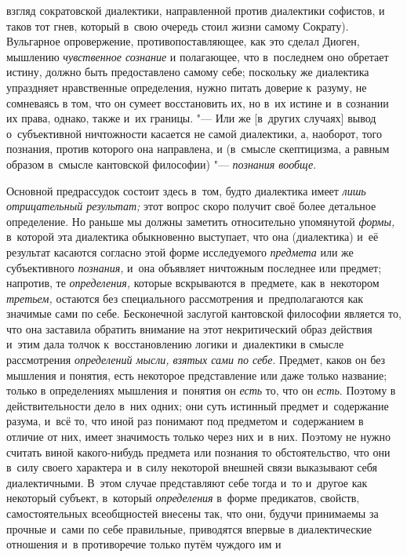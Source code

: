 взгляд сократовской диалектики, направленной против диалектики софистов, и
таков тот гнев, который в~свою очередь стоил жизни самому Сократу).
Вульгарное опровержение, противопоставляющее, как это сделал Диоген,
мышлению {\em чувственное сознание}
и полагающее, что в~последнем оно обретает истину, должно
быть предоставлено самому себе; поскольку же диалектика упраздняет
нравственные определения, нужно питать доверие к~разуму, не сомневаясь в
том, что он сумеет восстановить их, но в~их истине и~в сознании их права,
однако, также и~их границы. "--- Или же [в~других случаях]
вывод о~субъективной ничтожности касается не самой диалектики, а, наоборот,
того познания, против которого она направлена, и (в~смысле скептицизма, а
равным образом в~смысле кантовской философии) "--- {\em познания вообще}.

Основной предрассудок состоит здесь в~том, будто диалектика
имеет {\em лишь отрицательный
результат;} этот вопрос скоро получит своё более детальное
определение. Но раньше мы должны заметить относительно упомянутой
{\em формы,} в~которой
эта диалектика обыкновенно выступает, что она (диалектика) и~её результат
касаются согласно этой форме исследуемого {\em предмета} или же
субъективного {\em познания,} и~она объявляет ничтожным последнее или
предмет; напротив, те {\em определения,}
которые вскрываются в~предмете, как в~некотором {\em третьем,} остаются
без специального рассмотрения и~предполагаются как значимые сами по себе.
\label{bkm:bm126a}Бесконечной заслугой кантовской философии
является то, что она заставила обратить внимание на этот некритический
образ действия и~этим дала толчок к~восстановлению логики и~диалектики в
смысле рассмотрения {\em определений
мысли, взятых сами по себе}. Предмет, каков он без мышления
и понятия, есть некоторое представление или даже только название; только в
определениях мышления и~понятия он {\em есть} то, что он {\em есть}. Поэтому
в действительности дело в~них одних; они суть истинный предмет и~содержание
разума, и~всё то, что иной раз понимают под предметом и~содержанием в
отличие от них, имеет значимость только через них и~в них. Поэтому не нужно
считать виной какого-нибудь предмета или познания то обстоятельство, что
они в~силу своего характера и~в силу некоторой внешней связи выказывают
себя диалектичными. В~этом случае представляют себе тогда и~то и~другое как
некоторый субъект, в~который {\em определения} в~форме
предикатов, свойств, самостоятельных всеобщностей внесены так, что они,
будучи принимаемы за прочные и~сами по себе правильные, приводятся впервые
в диалектические отношения и~в противоречие только путём чуждого им и

